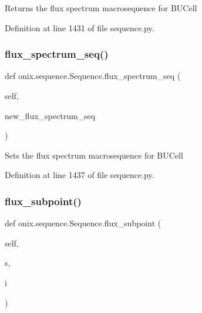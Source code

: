 \begin{DoxyVerb}Returns the flux spectrum macrosequence for BUCell
\end{DoxyVerb}
 

Definition at line 1431 of file sequence.\+py.

\mbox{\label{classonix_1_1sequence_1_1Sequence_a92e2986096244c35a1bb5ab86aa24db4}} 
\subsubsection{\texorpdfstring{flux\+\_\+spectrum\+\_\+seq()}{flux\_spectrum\_seq()}\hspace{0.1cm}{\footnotesize\ttfamily [2/2]}}
{\footnotesize\ttfamily def onix.\+sequence.\+Sequence.\+flux\+\_\+spectrum\+\_\+seq (\begin{DoxyParamCaption}\item[{}]{self,  }\item[{}]{new\+\_\+flux\+\_\+spectrum\+\_\+seq }\end{DoxyParamCaption})}

\begin{DoxyVerb}Sets the flux spectrum macrosequence for BUCell
\end{DoxyVerb}
 

Definition at line 1437 of file sequence.\+py.

\mbox{\label{classonix_1_1sequence_1_1Sequence_a8f803930e0bddcd26e986f48fa95c7b8}} 
\subsubsection{\texorpdfstring{flux\+\_\+subpoint()}{flux\_subpoint()}}
{\footnotesize\ttfamily def onix.\+sequence.\+Sequence.\+flux\+\_\+subpoint (\begin{DoxyParamCaption}\item[{}]{self,  }\item[{}]{s,  }\item[{}]{i }\end{DoxyParamCaption})}

